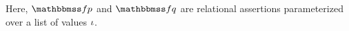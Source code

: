 Here, $\relspecpre$ and $\relspecpost$ are
relational assertions parameterized over a list of values
$\iota$.
